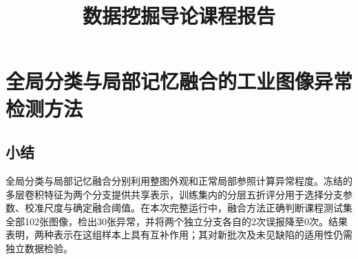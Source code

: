 \documentclass[sigconf,nonacm,screen]{acmart}
\title[数据挖掘导论课程报告]{数据挖掘导论课程报告}
\begin{document}
\maketitle
\section{全局分类与局部记忆融合的工业图像异常检测方法}
\label{sec:task2}


\newpage
\subsection{小结}
全局分类与局部记忆融合分别利用整图外观和正常局部参照计算异常程度。冻结的多层卷积特征为两个分支提供共享表示，训练集内的分层五折评分用于选择分支参数、校准尺度与确定融合阈值。在本次完整运行中，融合方法正确判断课程测试集全部102张图像，检出30张异常，并将两个独立分支各自的2次误报降至0次。结果表明，两种表示在这组样本上具有互补作用；其对新批次及未见缺陷的适用性仍需独立数据检验。
\FloatBarrier


\end{document}
